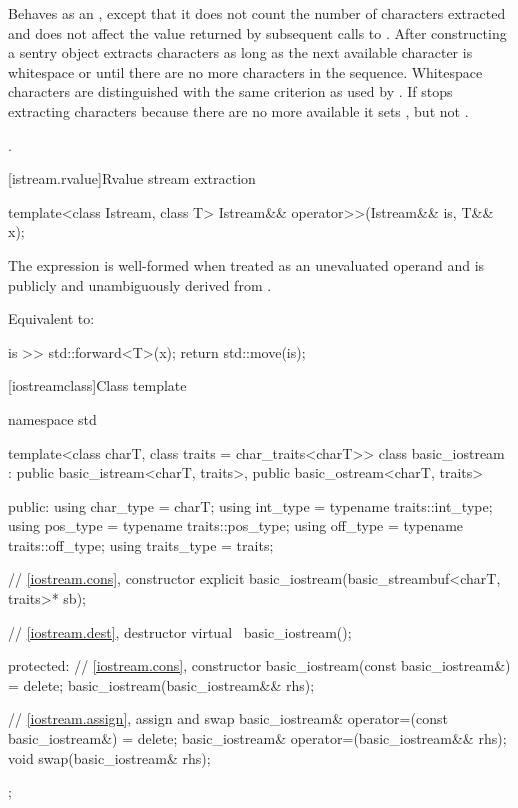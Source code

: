 \begin{itemdescr}
\pnum
\effects
Behaves as an , except that it does not count the number of characters extracted and
does not affect the value returned by subsequent calls to . After
constructing a sentry object extracts characters as long as the next available
character  is whitespace or until there are no more characters in the sequence.
Whitespace characters are distinguished with the same criterion as used by
.
If
stops extracting characters because there are no more available it sets
,
but not
.

\pnum
\returns
{}.
\end{itemdescr}

[istream.rvalue]{Rvalue stream extraction}

%
\begin{itemdecl}
template<class Istream, class T>
  Istream&& operator>>(Istream&& is, T&& x);
\end{itemdecl}

\begin{itemdescr}
\pnum
\constraints
The expression  is well-formed
when treated as an unevaluated operand and
 is publicly and unambiguously derived from .

\pnum
\effects
Equivalent to:
\begin{codeblock}
is >> std::forward<T>(x);
return std::move(is);
\end{codeblock}
\end{itemdescr}

[iostreamclass]{Class template }

%
\begin{codeblock}
namespace std {
  template<class charT, class traits = char_traits<charT>>
  class basic_iostream
    : public basic_istream<charT, traits>,
      public basic_ostream<charT, traits> {
  public:
    using char_type   = charT;
    using int_type    = typename traits::int_type;
    using pos_type    = typename traits::pos_type;
    using off_type    = typename traits::off_type;
    using traits_type = traits;

    // \ref{iostream.cons}, constructor
    explicit basic_iostream(basic_streambuf<charT, traits>* sb);

    // \ref{iostream.dest}, destructor
    virtual ~basic_iostream();

  protected:
    // \ref{iostream.cons}, constructor
    basic_iostream(const basic_iostream&) = delete;
    basic_iostream(basic_iostream&& rhs);

    // \ref{iostream.assign}, assign and swap
    basic_iostream& operator=(const basic_iostream&) = delete;
    basic_iostream& operator=(basic_iostream&& rhs);
    void swap(basic_iostream& rhs);
  };
}
\end{codeblock}

